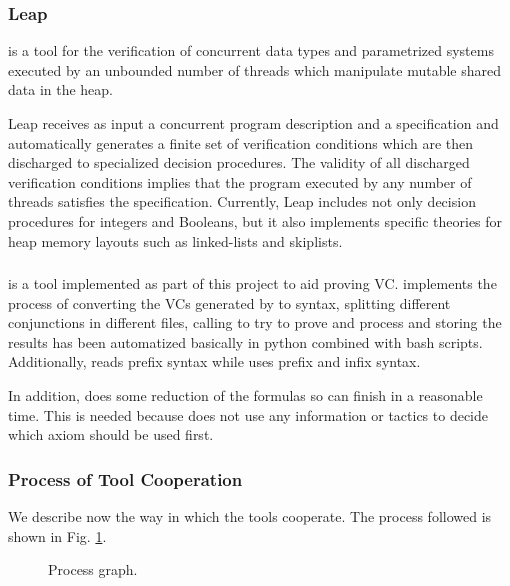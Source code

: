 \subsubsection{Leap}

\leap is a tool for the verification of concurrent data types and parametrized systems executed by an unbounded number of threads which manipulate mutable shared data in the heap.

Leap receives as input a concurrent program description and a specification and automatically generates a finite set of verification conditions which are then discharged to specialized decision procedures. 
%
The validity of all discharged verification conditions implies that the program executed by any number of threads satisfies the specification. 
%
Currently, Leap includes not only decision procedures for integers and Booleans, but it also implements specific theories for heap memory layouts such as linked-lists and skiplists.


\subsubsection{\gandalf}

\gandalf is a tool implemented  as part of this project to aid \spass proving \gls{VC}. 
%
\gandalf implements the process of converting the VCs generated by \leap to \spass syntax, splitting different conjunctions in different files, calling \spass to try to prove and process and storing the results has been automatized basically in python combined with bash scripts.
%
Additionally, \spass reads prefix syntax while \leap uses prefix and infix syntax.

In addition, \gandalf does some reduction of the formulas so \spass can finish in a reasonable time.
%
This is needed because \spass does not use any information or tactics to decide which axiom should be used first.


\subsubsection{Process of Tool Cooperation}

\label{ProcessDescription}
We describe now the way in which the tools cooperate.
%
The process followed is shown in Fig. \ref{fig:process}. 


\begin{figure}

\caption{Process graph.}
\label{fig:process}
\end{figure}

